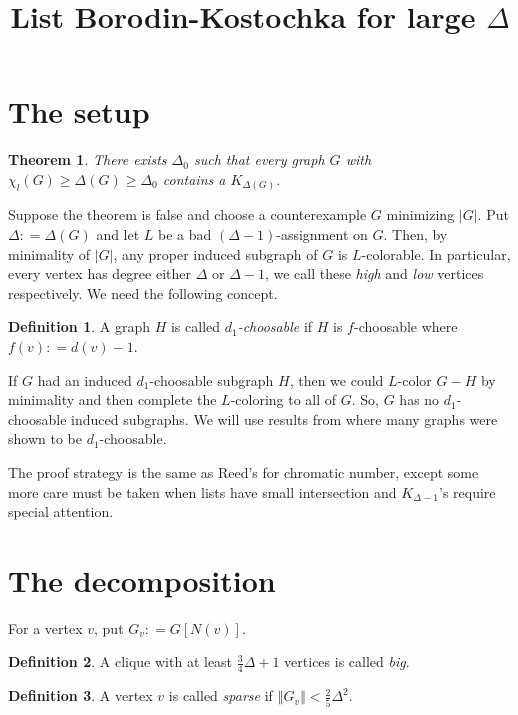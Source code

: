 \documentclass[12pt]{amsart}
\title{List Borodin-Kostochka for large $\Delta$}
\theoremstyle{plain}
\newtheorem{thm}{Theorem}
\theoremstyle{definition}
\newtheorem{defn}{Definition}
\theoremstyle{remark}
\newcommand{\card}[1]{\left|#1\right|}
\newcommand{\size}[1]{\left\Vert#1\right\Vert}
\newcommand{\DefinedAs}{\mathrel{\mathop:}=}
\begin{document}
\maketitle
\section{The setup}
\begin{thm}
There exists $\Delta_0$ such that every graph $G$ with $\chi_l(G) \geq \Delta(G)
\geq \Delta_0$ contains a $K_{\Delta(G)}$.
\end{thm}

Suppose the theorem is false and choose a counterexample $G$ minimizing
$\card{G}$.  Put $\Delta \DefinedAs \Delta(G)$ and let $L$ be a bad
$(\Delta - 1)$-assignment on $G$.  Then, by minimality of $\card{G}$, any proper
induced subgraph of $G$ is $L$-colorable.  In particular, every vertex has
degree either $\Delta$ or $\Delta-1$, we call these \emph{high} and \emph{low}
vertices respectively. We need the following concept.

\begin{defn}
A graph $H$ is called \emph{$d_1$-choosable} if $H$ is $f$-choosable where $f(v)
\DefinedAs d(v) - 1$.
\end{defn}

If $G$ had an induced $d_1$-choosable subgraph $H$, then we could
$L$-color $G - H$ by minimality and then complete the $L$-coloring to all of
$G$.  So, $G$ has no $d_1$-choosable induced subgraphs.  We will use results
from \cite{mules} where many graphs were shown to be $d_1$-choosable.

The proof strategy is the same as Reed's \cite{reed1999strengthening} for
chromatic number, except some more care must be taken when lists have small
intersection and $K_{\Delta-1}$'s require special attention.

\section{The decomposition}
For a vertex $v$, put $G_v \DefinedAs G[N(v)]$.

\begin{defn}
A clique with at least $\frac34 \Delta + 1$ vertices is called \emph{big}.
\end{defn}

\begin{defn}
A vertex $v$ is called \emph{sparse} if $\size{G_v} < \frac25 \Delta^2$.
\end{defn}
\end{document}
